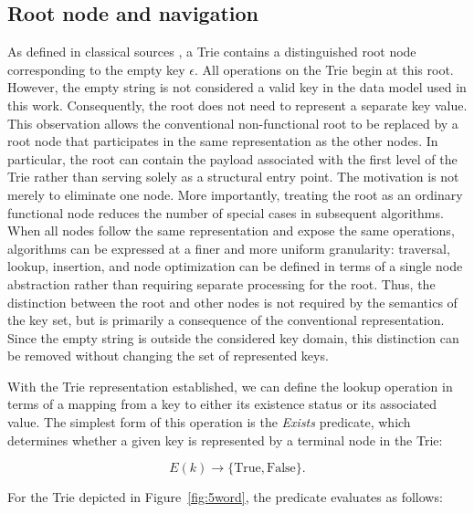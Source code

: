 \documentclass[11pt,twoside]{article}
\begin{document}
    \subsection{Root node and navigation}\label{root-node-and-navigation}

    As defined in classical sources \cite{knuthVol3,fds_alg}, a Trie contains a
    distinguished root node corresponding to the empty key $\epsilon$. All operations
    on the Trie begin at this root.
    However, the empty string is not considered a valid key in the
    data model used in this work. Consequently, the root does not need to represent
    a separate key value. This observation allows the conventional non-functional
    root to be replaced by a root node that participates in the same representation as the other
    nodes. In particular, the root can contain the payload associated with the first level
    of the Trie rather than serving solely as a structural entry point.
    The motivation is not merely to eliminate one node. More importantly, treating
    the root as an ordinary functional node reduces the number of special cases in subsequent
    algorithms. When all nodes follow the same representation and expose the same operations,
    algorithms can be expressed at a finer and more uniform granularity: traversal, lookup,
    insertion, and node optimization can be defined in terms of a single node abstraction rather than requiring
    separate processing for the root. Thus, the distinction between the root and other nodes is not required
    by the semantics of the key set, but is primarily a consequence of the conventional representation.
    Since the empty string is outside the considered key domain, this distinction can be removed without
    changing the set of represented keys.

    With the Trie representation established, we can define the lookup operation in terms of a mapping
    from a key to either its existence status or its associated value. The simplest form of this
    operation is the \textit{Exists} predicate, which determines whether a given key is represented by a terminal
    node in the Trie:

    \begin{equation}
        E(k) \rightarrow \{\mathrm{True},\mathrm{False}\}.
    \end{equation}

    For the Trie depicted in Figure~\ref{fig:5word}, the predicate evaluates as follows:
\end{document}
